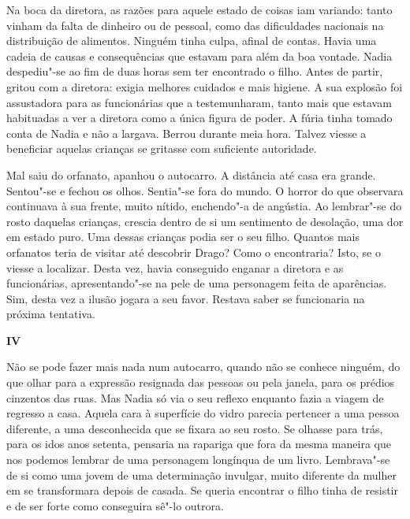 Na boca da diretora, as razões para aquele estado de
coisas iam variando: tanto vinham da falta de dinheiro ou
de pessoal, como das dificuldades nacionais na distribuição de
alimentos. Ninguém tinha culpa, afinal de contas. Havia uma cadeia de
causas e consequências que estavam para além da boa vontade. Nadia
despediu"-se ao fim de duas horas sem ter encontrado o filho. Antes de
partir, gritou com a diretora: exigia melhores cuidados e mais higiene.
A sua explosão foi assustadora para as funcionárias que a
testemunharam, tanto mais que estavam habituadas a ver a diretora
como a única figura de poder. A fúria tinha tomado conta de Nadia e não
a largava. Berrou durante meia hora. Talvez viesse a beneficiar aquelas crianças se gritasse com suficiente autoridade.

Mal saiu do orfanato, apanhou o autocarro. A distância até casa era
grande. Sentou"-se e fechou os olhos. Sentia"-se fora do mundo. O horror
do que observara continuava à sua frente, muito nítido, enchendo"-a de
angústia. Ao lembrar"-se do rosto daquelas crianças, crescia dentro de si
um sentimento de desolação, uma dor em estado puro. Uma dessas crianças
podia ser o seu filho. Quantos mais orfanatos teria de visitar até
descobrir Drago? Como o encontraria? Isto, se o viesse a localizar.
Desta vez, havia conseguido enganar a diretora e as funcionárias,
apresentando"-se na pele de uma personagem feita de aparências. Sim,
desta vez a ilusão jogara a seu favor. Restava saber se funcionaria na
próxima tentativa.

\pagebreak

\movetooddpage
\vspace*{1.8cm}
\noindent{}\textbf{IV}

\bigskip

Não se pode fazer mais nada num autocarro, quando não se conhece
ninguém, do que olhar para a expressão resignada das pessoas ou pela
janela, para os prédios cinzentos das ruas. Mas Nadia só via o seu
reflexo enquanto fazia a viagem de regresso a casa. Aquela cara à
superfície do vidro parecia pertencer a uma pessoa diferente, a uma
desconhecida que se fixara ao seu rosto. Se olhasse para trás, para os
idos anos setenta, pensaria na rapariga que fora da mesma maneira que
nos podemos lembrar de uma personagem longínqua de um livro. Lembrava"-se
de si como uma jovem de uma determinação invulgar, muito diferente da
mulher em se transformara depois de casada. Se queria encontrar o filho
tinha de resistir e de ser forte como conseguira sê"-lo outrora.

